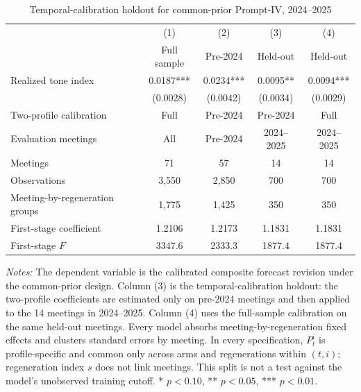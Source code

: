 \begin{table}[htbp]
\color{revisionred}
\centering
\begin{threeparttable}
\caption{Temporal-calibration holdout for common-prior Prompt-IV, 2024--2025}
\label{tab:heldout-iv}
\begin{scriptsize}
\setlength{\tabcolsep}{4.2pt}
\begin{tabular}{lcccc}
\toprule
 & (1) & (2) & (3) & (4) \\
 & Full sample & Pre-2024 & Held-out & Held-out \\
\midrule
Realized tone index & 0.0187*** & 0.0234*** & 0.0095** & 0.0094*** \\
 & (0.0028) & (0.0042) & (0.0034) & (0.0029) \\
\midrule
Two-profile calibration & Full & Pre-2024 & Pre-2024 & Full \\
Evaluation meetings & All & Pre-2024 & 2024--2025 & 2024--2025 \\
Meetings & 71 & 57 & 14 & 14 \\
Observations & 3,550 & 2,850 & 700 & 700 \\
Meeting-by-regeneration groups & 1,775 & 1,425 & 350 & 350 \\
First-stage coefficient & 1.2106 & 1.2173 & 1.1831 & 1.1831 \\
First-stage $F$ & 3347.6 & 2333.3 & 1877.4 & 1877.4 \\
\bottomrule
\end{tabular}
\begin{tablenotes}[flushleft]
\scriptsize
\item \textit{Notes:} The dependent variable is the calibrated composite forecast revision under the common-prior design. Column (3) is the temporal-calibration holdout: the two-profile coefficients are estimated only on pre-2024 meetings and then applied to the 14 meetings in 2024--2025. Column (4) uses the full-sample calibration on the same held-out meetings. Every model absorbs meeting-by-regeneration fixed effects and clusters standard errors by meeting. In every specification, $P_t^i$ is profile-specific and common only across arms and regenerations within $(t,i)$; regeneration index $s$ does not link meetings. This split is not a test against the model's unobserved training cutoff. * $p<0.10$, ** $p<0.05$, *** $p<0.01$.
\end{tablenotes}
\end{scriptsize}
\end{threeparttable}
\end{table}
